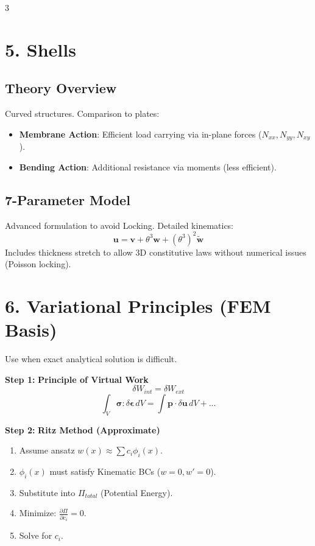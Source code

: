 \documentclass[8pt]{extarticle}
\newcommand{\step}[1]{\textbf{\scriptsize Step #1:}}
\begin{document}
\begin{multicols*}{3}
\section{5. Shells}
\subsection{Theory Overview}
Curved structures. Comparison to plates:
\begin{itemize}
    \item \textbf{Membrane Action}: Efficient load carrying via in-plane forces ($N_{xx}, N_{yy}, N_{xy}$).
    \item \textbf{Bending Action}: Additional resistance via moments (less efficient).
\end{itemize}

\subsection{7-Parameter Model}
Advanced formulation to avoid Locking.
Detailed kinematics:
\[ \mathbf{u} = \mathbf{v} + \theta^3 \mathbf{w} + (\theta^3)^2 \tilde{\mathbf{w}} \]
Includes thickness stretch to allow 3D constitutive laws without numerical issues (Poisson locking).

\section{6. Variational Principles (FEM Basis)}
Use when exact analytical solution is difficult.

\step{1} \textbf{Principle of Virtual Work}
\[ \delta W_{int} = \delta W_{ext} \]
\[ \int_V \boldsymbol{\sigma} : \delta\boldsymbol{\epsilon} \, dV = \int \mathbf{p} \cdot \delta\mathbf{u} \, dV + ... \]

\step{2} \textbf{Ritz Method (Approximate)}
\begin{enumerate}
    \item Assume ansatz $w(x) \approx \sum c_i \phi_i(x)$.
    \item $\phi_i(x)$ must satisfy Kinematic BCs ($w=0, w'=0$).
    \item Substitute into $\Pi_{total}$ (Potential Energy).
    \item Minimize: $\frac{\partial \Pi}{\partial c_i} = 0$.
    \item Solve for $c_i$.
\end{enumerate}

\end{multicols*}
\end{document}
